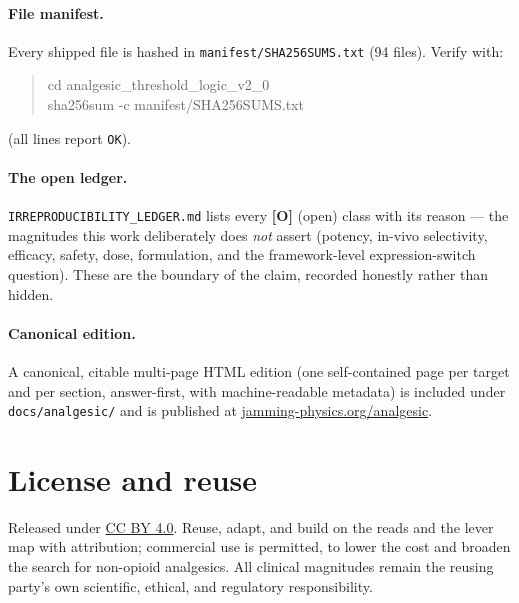 \documentclass[11pt]{article}
\newcommand{\gO}{\textcolor{go}{\textbf{[O]}}}
\newcommand{\code}[1]{\texttt{#1}}
\begin{document}
\paragraph{File manifest.} Every shipped file is hashed in \code{manifest/SHA256SUMS.txt} (94 files). Verify with:
\begin{quote}\small\ttfamily
cd analgesic\_threshold\_logic\_v2\_0\\
sha256sum -c manifest/SHA256SUMS.txt
\end{quote}
(all lines report \code{OK}).

\paragraph{The open ledger.} \code{IRREPRODUCIBILITY\_LEDGER.md} lists every \gO{} (open) class with its reason --- the magnitudes this work deliberately does \emph{not} assert (potency, in-vivo selectivity, efficacy, safety, dose, formulation, and the framework-level expression-switch question). These are the boundary of the claim, recorded honestly rather than hidden.

\paragraph{Canonical edition.} A canonical, citable multi-page HTML edition (one self-contained page per target and per section, answer-first, with machine-readable metadata) is included under \code{docs/analgesic/} and is published at \href{https://jamming-physics.org/analgesic/}{jamming-physics.org/analgesic}.

\section*{License and reuse}
Released under \href{https://creativecommons.org/licenses/by/4.0/}{CC BY 4.0}. Reuse, adapt, and build on the reads and the lever map with attribution; commercial use is permitted, to lower the cost and broaden the search for non-opioid analgesics. All clinical magnitudes remain the reusing party's own scientific, ethical, and regulatory responsibility.
\end{document}
